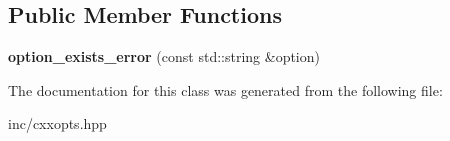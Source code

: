 \subsection*{Public Member Functions}
\begin{DoxyCompactItemize}
\item 
{\bfseries option\+\_\+exists\+\_\+error} (const std\+::string \&option)\hypertarget{classcxxopts_1_1option__exists__error_a2734bc9372936fa24999f08ad3032bca}{}\label{classcxxopts_1_1option__exists__error_a2734bc9372936fa24999f08ad3032bca}

\end{DoxyCompactItemize}


The documentation for this class was generated from the following file\+:\begin{DoxyCompactItemize}
\item 
inc/cxxopts.\+hpp\end{DoxyCompactItemize}
